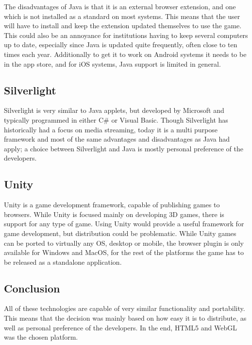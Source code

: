 The disadvantages of Java is that it is an external browser extension, and one which is not installed as a standard on most systems.
This means that the user will have to install and keep the extension updated themselves to use the game. This could also
be an annoyance for institutions having to keep several computers up to date, especially since Java is updated quite frequently, often close to ten times each year.\cite{javahistory13}
Additionally to get it to work on Android systems it needs to be in the app store, and for iOS systems, Java support is limited in general.

\subsection{Silverlight}
Silverlight is very similar to Java applets, but developed by Microsoft and typically programmed in either C\# or Visual Basic.\cite{silverlight13}
Though Silverlight has historically had a focus on media streaming, today it is a multi purpose framework and most of the same advantages and disadvantages as Java had apply; a choice between Silverlight and Java is mostly personal preference of the developers.

\subsection{Unity}
Unity is a game development framework, capable of publishing games to browsers.\cite{unity13} While Unity is focused mainly on developing 3D games, there is support for any type of game.
Using Unity would provide a useful framework for game development, but distribution could be problematic. While Unity games can be ported to virtually any OS, desktop or mobile, the browser
plugin is only available for Windows and MacOS, for the rest of the platforms the game has to be released as a standalone application.

\subsection{Conclusion}
All of these technologies are capable of very similar functionality and portability. This means that the decision was mainly based on how easy it is to distribute, as well as personal
preference of the developers. In the end, HTML5 and WebGL was the chosen platform.